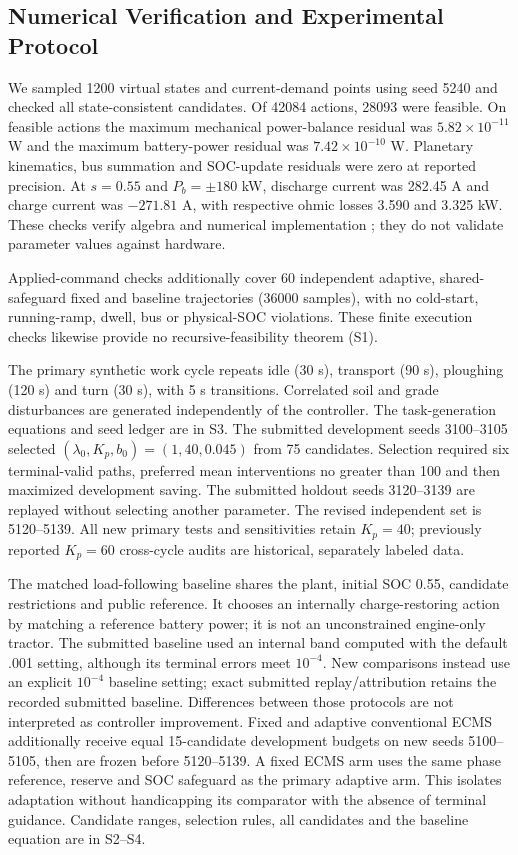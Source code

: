 \documentclass[energies,article,submit,moreauthors]{Definitions/mdpi}
\begin{document}
\subsection{Numerical Verification and Experimental Protocol}
We sampled 1200 virtual states and current-demand points using seed 5240 and checked all state-consistent candidates. Of 42084 actions, 28093 were feasible. On feasible actions the maximum mechanical power-balance residual was $5.82\times10^{-11}$ W and the maximum battery-power residual was $7.42\times10^{-10}$ W. Planetary kinematics, bus summation and SOC-update residuals were zero at reported precision. At $s=0.55$ and $P_b=\pm180$ kW, discharge current was 282.45 A and charge current was $-271.81$ A, with respective ohmic losses 3.590 and 3.325 kW. These checks verify algebra and numerical implementation \cite{sargent2013}; they do not validate parameter values against hardware.

Applied-command checks additionally cover 60 independent adaptive, shared-safeguard fixed and baseline trajectories (36000 samples), with no cold-start, running-ramp, dwell, bus or physical-SOC violations. These finite execution checks likewise provide no recursive-feasibility theorem (S1).

The primary synthetic work cycle repeats idle (30 s), transport (90 s), ploughing (120 s) and turn (30 s), with 5 s transitions. Correlated soil and grade disturbances are generated independently of the controller. The task-generation equations and seed ledger are in S3. The submitted development seeds 3100--3105 selected $(\lambda_0,K_p,b_0)=(1,40,0.045)$ from 75 candidates. Selection required six terminal-valid paths, preferred mean interventions no greater than 100 and then maximized development saving. The submitted holdout seeds 3120--3139 are replayed without selecting another parameter. The revised independent set is 5120--5139. All new primary tests and sensitivities retain $K_p=40$; previously reported $K_p=60$ cross-cycle audits are historical, separately labeled data.

The matched load-following baseline shares the plant, initial SOC 0.55, candidate restrictions and public reference. It chooses an internally charge-restoring action by matching a reference battery power; it is not an unconstrained engine-only tractor. The submitted baseline used an internal band computed with the default .001 setting, although its terminal errors meet $10^{-4}$. New comparisons instead use an explicit $10^{-4}$ baseline setting; exact submitted replay/attribution retains the recorded submitted baseline. Differences between those protocols are not interpreted as controller improvement. Fixed and adaptive conventional ECMS additionally receive equal 15-candidate development budgets on new seeds 5100--5105, then are frozen before 5120--5139. A fixed ECMS arm uses the same phase reference, reserve and SOC safeguard as the primary adaptive arm. This isolates adaptation without handicapping its comparator with the absence of terminal guidance. Candidate ranges, selection rules, all candidates and the baseline equation are in S2--S4.
\end{document}
